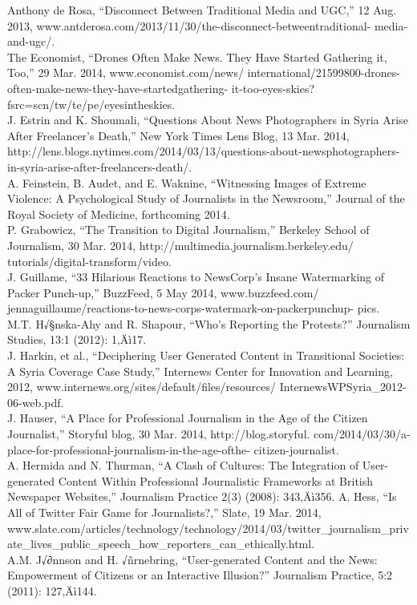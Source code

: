 Anthony de Rosa, ``Disconnect Between Traditional Media and UGC,'' 12
Aug. 2013, www.antderosa.com/2013/11/30/the-disconnect-betweentraditional-
media-and-ugc/.\\
The Economist, ``Drones Often Make News. They Have Started
Gathering it, Too,'' 29 Mar. 2014, www.economist.com/news/
international/21599800-drones-often-make-news-they-have-startedgathering-
it-too-eyes-skies?fsrc=scn/tw/te/pe/eyesintheskies.\\
J. Estrin and K. Shoumali, ``Questions About News Photographers in Syria
Arise After Freelancer's Death,'' New York Times Lens Blog, 13 Mar. 2014,
http://lens.blogs.nytimes.com/2014/03/13/questions-about-newsphotographers-
in-syria-arise-after-freelancers-death/.\\
A. Feinstein, B. Audet, and E. Waknine, ``Witnessing Images of Extreme
Violence: A Psychological Study of Journalists in the Newsroom,'' Journal
of the Royal Society of Medicine, forthcoming 2014.\\

P. Grabowicz, ``The Transition to Digital Journalism,'' Berkeley School of
Journalism, 30 Mar. 2014, http://multimedia.journalism.berkeley.edu/
tutorials/digital-transform/video.\\
J. Guillame, ``33 Hilarious Reactions to NewsCorp's Insane Watermarking
of Packer Punch-up,'' BuzzFeed, 5 May 2014, www.buzzfeed.com/
jennaguillaume/reactions-to-news-corps-watermark-on-packerpunchup-
pics.\\
M.T. H√§nska-Ahy and R. Shapour, ``Who's Reporting the Protests?''
Journalism Studies, 13:1 (2012): 1‚Äì17.\\
J. Harkin, et al., ``Deciphering User Generated Content in Transitional
Societies: A Syria Coverage Case Study,'' Internews Center for Innovation
and Learning, 2012, www.internews.org/sites/default/files/resources/
InternewsWPSyria_2012-06-web.pdf.\\
J. Hauser, ``A Place for Professional Journalism in the Age of the
Citizen Journalist,'' Storyful blog, 30 Mar. 2014, http://blog.storyful.
com/2014/03/30/a-place-for-professional-journalism-in-the-age-ofthe-
citizen-journalist.\\
A. Hermida and N. Thurman, ``A Clash of Cultures: The Integration of
User-generated Content Within Professional Journalistic Frameworks at
British Newspaper Websites,'' Journalism Practice 2(3) (2008): 343‚Äì356.
A. Hess, ``Is All of Twitter Fair Game for Journalists?,'' Slate, 19 Mar. 2014,
www.slate.com/articles/technology/technology/2014/03/twitter_journalism_private_lives_public_speech_how_reporters_can_ethically.html.\\
A.M. J√∂nnson and H. √ñrnebring, ``User-generated Content and the News:
Empowerment of Citizens or an Interactive Illusion?'' Journalism Practice,
5:2 (2011): 127‚Äì144.\\

